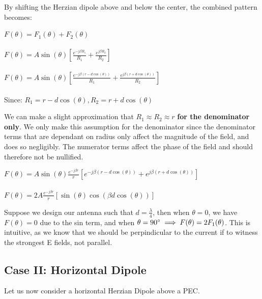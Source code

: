 \documentclass{article}
\begin{document}
By shifting the Herzian dipole above and below the center, the combined pattern becomes:

\begin{center}
    $F(\theta) = F_1(\theta) + F_2(\theta)$ \\ 
    \hspace{} \\
    $F(\theta) = A \sin(\theta) [\frac{e^{-j \beta R_1}}{R_1} + \frac{e^{j \beta R_2}}{R_2}]$ \\
    \hspace{} \\
    $F(\theta) = A \sin(\theta) [\frac{e^{-j \beta (r-d\cos(\theta))}}{R_1} + \frac{e^{j \beta (r + d \cos(\theta))}}{R_2}]$ \\
    \hspace{} \\
    Since: $R_1 = r - d\cos(\theta), R_2 = r + d\cos(\theta)$
\end{center}

We can make a slight approximation that $R_1 \approx R_2 \approx r$ \textbf{for the denominator only}. We only make this assumption for the denominator since the denominator terms that are dependant on radius only affect the magnitude of the field, and does so negligibly. The numerator terms affect the phase of the field and should therefore not be nullified.

\begin{center}
    $F(\theta) = A \sin(\theta) \frac{e^{-j\beta r}}{r} [e^{-j \beta (r-d\cos(\theta))} + e^{j \beta (r + d \cos(\theta))}]$ \\
    \hspace{} \\
    $F(\theta) = 2A \frac{e^{-j\beta r}}{r}[\sin(\theta) \cos(\beta d \cos(\theta))]$
\end{center}

Suppose we design our antenna such that $d = \frac{\lambda}{4}$, then when $\theta = 0$, we have $F(\theta) = 0$ due to the sin term, and when $\theta = 90 \degree \implies F(\theta) = 2F_1(\theta)$. This is intuitive, as we know that we should be perpindicular to the current if to witness the strongest E fields, not parallel.

\subsection{Case II: Horizontal Dipole}

Let us now consider a horizontal Herzian Dipole above a PEC.
\end{document}

